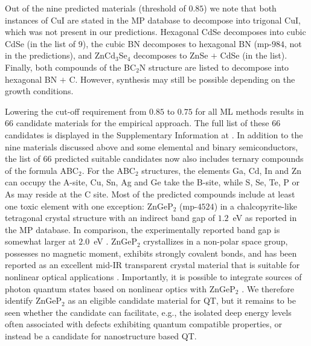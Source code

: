 \documentclass[superscriptaddress,unsortedaddress,
 amsmath,amssymb,
 aps,
]{revtex4-2}
\begin{document}
Out of the nine predicted materials (threshold of $0.85$) we note that both instances of CuI are stated in the MP database to decompose into trigonal CuI, which was not present in our predictions. Hexagonal CdSe decomposes into cubic CdSe (in the list of $9$), the cubic BN decomposes to hexagonal BN (mp-$984$, not in the predictions), and ZnCd$_3$Se$_4$ decomposes to ZnSe $+$ CdSe (in the list). Finally, both compounds of the BC$_2$N structure are listed to decompose into hexagonal BN $+$ C. 
However, synthesis may still be possible depending on the growth conditions. 

Lowering the cut-off requirement from $0.85$ to $0.75$ for all ML methods results in $66$ candidate materials for the empirical approach.  
The full list of these $66$ candidates is displayed in the Supplementary Information at \cite{supplementary}. 
In addition to the nine materials discussed above and some elemental and binary semiconductors, the list of $66$ predicted suitable candidates now also includes ternary compounds of the formula ABC$_2$. For the ABC$_2$ structures, the elements Ga, Cd, In and Zn can occupy the A-site, Cu, Sn, Ag and Ge take the B-site, while S, Se, Te, P or As may reside at the C site. Most of the predicted compounds include at least one toxic element with one exception: ZnGeP$_2$ (mp-$4524$) in a chalcopyrite-like tetragonal crystal structure with an indirect band gap of $1.2$~eV \cite{Zhang2015} as reported in the MP database. In comparison, the experimentally reported band gap is somewhat larger at $2.0$~eV \cite{Xing1989}. 
ZnGeP$_2$ crystallizes in a non-polar space group, possesses no magnetic moment, exhibits strongly covalent bonds, and has been reported as an excellent mid-IR transparent crystal material that is suitable for nonlinear optical applications \cite{Zhang2015}. Importantly, it is possible to integrate sources of photon quantum states based on nonlinear optics with ZnGeP$_2$ \cite{Caspani2017}. 
We therefore identify ZnGeP$_2$ as an eligible candidate material for QT, but it remains to be seen whether the candidate can facilitate, e.g., the isolated deep energy levels often associated with defects exhibiting quantum compatible properties, or instead be a candidate for nanostructure based QT.  
\end{document}
